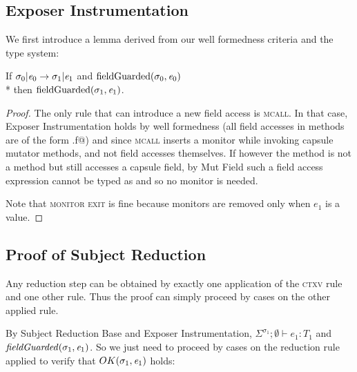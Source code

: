 \subsection{Exposer Instrumentation}
We first introduce a lemma derived from our well formedness criteria and the type system:
\begin{Lemma}
If $\sigma_0 | \e_0\rightarrow \sigma_1 |\e_1$ and
$\text{fieldGuarded}(\sigma_0,\e_0)$
\\*
then $\text{fieldGuarded}(\sigma_1,\e_1)$.
\end{Lemma}
\begin{proof}
The only rule that can
introduce a new field access is \textsc{mcall}.
In that case, Exposer Instrumentation holds
by well formedness (all field accesses in methods are of the form \Q@this.f@)
and since \textsc{mcall} inserts a monitor while invoking capsule mutator methods, and not field accesses themselves. If however the method is not a \Q@mut@ method but still accesses a capsule field, by Mut Field such a field access expression cannot be typed as \Q@mut@ and so no monitor is needed.

Note that \textsc{monitor exit} is fine because monitors are removed only when
 $e_1$ is a value.
\end{proof}

\subsection{Proof of Subject Reduction}\saveSpace
Any reduction step can be obtained
by exactly one application of the \textsc{ctxv} rule and one other rule. Thus the proof can simply proceed by cases on the other applied rule.

By Subject Reduction Base and Exposer Instrumentation,
$\Sigma^{\sigma_1};\emptyset\vdash e_1: T_1$ and  $\mathit{fieldGuarded}(\sigma_1,\e_1)$. So we just need to proceed by cases on the reduction rule applied to verify that $OK(\sigma_1,\e_1)$ holds:


